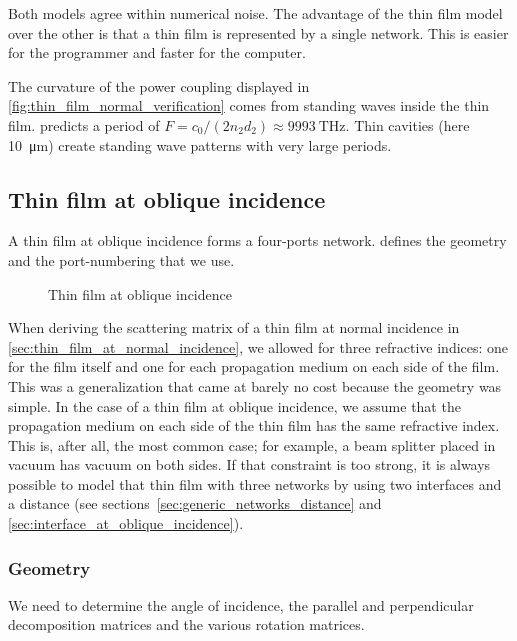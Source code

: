 Both models agree within numerical noise.
The advantage of the thin film model over the other is that a thin film is represented by a single network.
This is easier for the programmer and faster for the computer.

The curvature of the power coupling displayed in \cref{fig:thin_film_normal_verification} comes from standing waves inside the thin film.
 predicts a period of $F = c_0 / (2 n_2 d_2) \approx \SI{9993}{\tera\hertz}$.
Thin cavities (here \SI{10}{\micro\meter}) create standing wave patterns with very large periods.



\subsection{Thin film at oblique incidence}

A thin film at oblique incidence forms a four-ports network.
 defines the geometry and the port-numbering that we use.
\begin{figure}[hbtp]
    \centering
    \caption{Thin film at oblique incidence}
    \label{fig:thin_film_oblique}
\end{figure}

When deriving the scattering matrix of a thin film at normal incidence in \cref{sec:thin_film_at_normal_incidence}, we allowed for three refractive indices: one for the film itself and one for each propagation medium on each side of the film.
This was a generalization that came at barely no cost because the geometry was simple.
In the case of a thin film at oblique incidence, we assume that the propagation medium on each side of the thin film has the same refractive index.
This is, after all, the most common case;
for example, a beam splitter placed in vacuum has vacuum on both sides.
If that constraint is too strong, it is always possible to model that thin film with three networks by using two interfaces and a distance (see sections~\ref{sec:generic_networks_distance} and \ref{sec:interface_at_oblique_incidence}).

\subsubsection{Geometry}
\label{sec:thin_film_geometry}
We need to determine the angle of incidence, the parallel and perpendicular decomposition matrices and the various rotation matrices.

